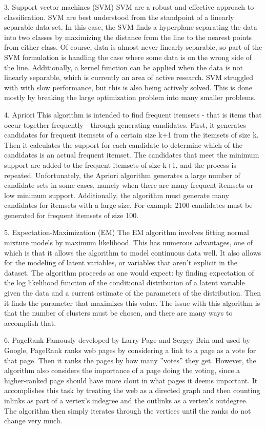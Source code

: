 3. Support vector machines (SVM)  SVM are a robust and effective 
approach to classification.
SVM are best understood from the standpoint of a linearly
separable data set. In this case, the SVM finds a hyperplane
separating the data into two classes by maximizing the distance
from the line to the nearest points from either class. Of
course, data is almost never linearly separable, so part of the
SVM formulation is handling the case where some data is on
the wrong side of the line. Additionally, a kernel function
can be applied when the data is not linearly separable, which
is currently an area of active research. SVM struggled with
with slow performance, but this is also being actively solved.
This is done mostly by breaking the large optimization problem
into many smaller problems.

4. Apriori  This algorithm is intended to find frequent itemsets - that is
items that occur together frequently - through generating candidates.
First, it generates candidates for frequent itemsets of
a certain size k+1 from the itemsets of size k. Then it calculates
the support for each candidate to determine which of the
candidates is an actual frequent itemset. The candidates that
meet the minimum support are added to the frequent itemsets
of size k+1, and the process is repeated. Unfortunately, the
Apriori algorithm generates a large number of candidate sets
in some cases, namely when there are many frequent itemsets
or low minimum support. Additionally, the algorithm
must generate many candidates for itemsets with a large size.
For example 2100 candidates must be generated for frequent
itemsets of size 100.

5. Expectation-Maximization (EM)  The EM algorithm involves 
fitting normal mixture models
by maximum likelihood. This has numerous advantages, one
of which is that it allows the algorithm to model continuous
data well. It also allows for the modeling of latent variables,
or variables that aren’t explicit in the dataset. The algorithm
proceeds as one would expect: by finding expectation of the
log likelihood function of the conditional distribution of a
latent variable given the data and a current estimate of the
parameters of the distribution. Then it finds the parameter that
maximizes this value. The issue with this algorithm is that the
number of clusters must be chosen, and there are many ways
to accomplish that.

6. PageRank  Famously developed by Larry Page and Sergey Brin and used
by Google, PageRank ranks web pages by considering a link
to a page as a vote for that page. Then it ranks the pages
by how many ”votes” they get. However, the algorithm also
considers the importance of a page doing the voting, since
a higher-ranked page should have more clout in what pages
it deems important. It accomplishes this task by treating the
web as a directed graph and then counting inlinks as part of
a vertex’s indegree and the outlinks as a vertex’s outdegree.
The algorithm then simply iterates through the vertices until
the ranks do not change very much.


